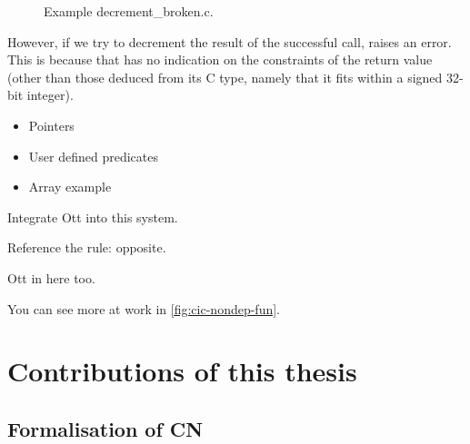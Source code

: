 \begin{figure}[h]
    \centering
    \caption{Example decrement\_broken.c.}\label{fig:decr-broken}
\end{figure}

However, if we try to decrement the result of the successful call, 
raises an error. This is because that  has no indication on the
constraints of the return value (other than those deduced from its C type,
namely that it fits within a signed 32-bit integer).

\begin{itemize}
    \item Pointers
    \item User defined predicates
    \item Array example
\end{itemize}

\begin{marginfigure}
  \ContinuedFloat*
  \begin{mathpar}
      \label{rule:cic-var}
  \end{mathpar}
  \caption{Integrate Ott into this system.}\label{fig:cic-var}
\end{marginfigure}

Reference the rule:  opposite.

\begin{marginfigure}
\ContinuedFloat{}
  \caption{Ott in here too.}\label{fig:cic-nondep-fun}
\end{marginfigure}

You can see more at work in \cref{fig:cic-nondep-fun}.

\section{Contributions of this thesis}\label{sec:contributions}

\subsection{Formalisation of CN}

